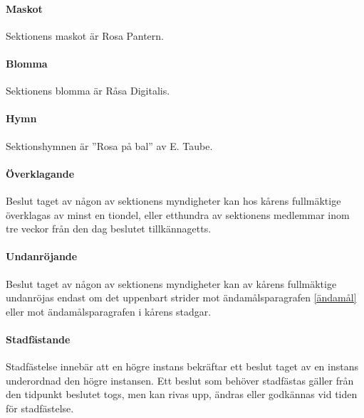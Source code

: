 \documentclass{dsekstatutes}
\begin{document}
\paragraph{Maskot}
Sektionens maskot är Rosa Pantern.

\paragraph{Blomma}
Sektionens blomma är Råsa Digitalis.

\paragraph{Hymn}
Sektionshymnen är ”Rosa på bal” av E. Taube.

\paragraph{Överklagande}
Beslut taget av någon av sektionens myndigheter kan hos kårens fullmäktige
överklagas av minst en tiondel, eller etthundra av sektionens medlemmar inom tre
veckor från den dag beslutet tillkännagetts.

\paragraph{Undanröjande}
Beslut taget av någon av sektionens myndigheter kan av kårens fullmäktige
undanröjas endast om det uppenbart strider mot ändamålsparagrafen \ref{ändamål}
eller mot ändamålsparagrafen i kårens stadgar.

\paragraph{Stadfästande}
Stadfästelse innebär att en högre instans bekräftar ett beslut taget av en
instans underordnad den högre instansen. Ett beslut som behöver stadfästas
gäller från den tidpunkt beslutet togs, men kan rivas upp, ändras eller
godkännas vid tiden för stadfästelse.
\end{document}
